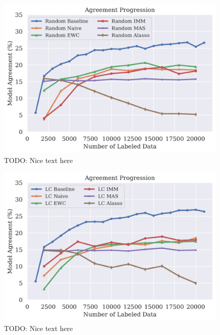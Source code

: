 \begin{figure}[h]
    \centering
    \includegraphics[width=0.8\linewidth]{images/results_CALMS/cifar100_softmax_random.png}
    \caption[Agreement Comparison for Model Stealing on CIFAR100 using the softmax output and the Active Learning strategy Random]{TODO: Nice text here}
    \label{fig:CALMSCIFAR100SoftmaxRandom}
\end{figure}

\begin{figure}[h]
    \centering
    \includegraphics[width=0.8\linewidth]{images/results_CALMS/cifar100_softmax_lc.png}
    \caption[Agreement Comparison for Model Stealing on CIFAR100 using the softmax output and the Active Learning strategy LC]{TODO: Nice text here}
    \label{fig:CALMSCIFAR100SoftmaxLC}
\end{figure}

